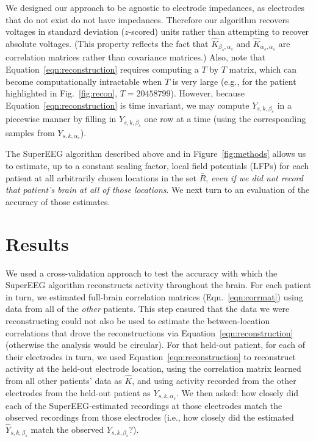 \documentclass[11pt]{article}
\begin{document}
We designed our approach to be agnostic to electrode impedances, as
electrodes that do not exist do not have impedances.  Therefore our
algorithm recovers voltages in standard deviation ($z$-scored) units
rather than attempting to recover absolute voltages. (This property
reflects the fact that $\hat{K}_{\beta_s, \alpha_s}$ and
$\hat{K}_{\alpha_s, \alpha_s}$ are correlation matrices rather than
covariance matrices.)  Also, note that
Equation~\ref{eqn:reconstruction} requires computing a $T$ by $T$
matrix, which can become computationally intractable when $T$ is very
large (e.g., for the patient highlighted in Fig.~\ref{fig:recon}, $T =
20458799$). However, because Equation~\ref{eqn:reconstruction} is time
invariant, we may compute $Y_{s,k,\beta_s}$ in a piecewise
manner by filling in $Y_{s,k,\beta_s}$ one row at a time (using the
corresponding samples from $Y_{s, k, \alpha_s}$).

The SuperEEG algorithm described above and in Figure~\ref{fig:methods}
allows us to estimate, up to a constant scaling factor, local field
potentials (LFPs) for each patient at all arbitrarily chosen locations
in the set $\bar{R}$, \textit{even if we did not record that patient's
  brain at all of those locations}.  We next turn to an evaluation of
the accuracy of those estimates.

\section*{Results}
We used a cross-validation approach to test the accuracy with which
the SuperEEG algorithm reconstructs activity throughout the brain.
For each patient in turn, we estimated full-brain correlation matrices
(Eqn.~\ref{eqn:corrmat}) using data from all of the \textit{other}
patients. This step ensured that the data we were reconstructing could
not also be used to estimate the between-location correlations that
drove the reconstructions via Equation~\ref{eqn:reconstruction}
(otherwise the analysis would be circular).  For that held-out
patient, for each of their electrodes in turn, we used
Equation~\ref{eqn:reconstruction} to reconstruct activity at the
held-out electrode location, using the correlation matrix learned from
all other patients' data as $\hat{K}$, and using activity recorded
from the other electrodes from the held-out patient as
$Y_{s, k, \alpha_s}$.  We then asked: how closely did each of the
SuperEEG-estimated recordings at those electrodes match the observed
recordings from those electrodes (i.e., how closely did the estimated
$\hat{Y}_{s, k, \beta_s}$ match the observed $Y_{s, k, \beta_s}$?).
\end{document}
